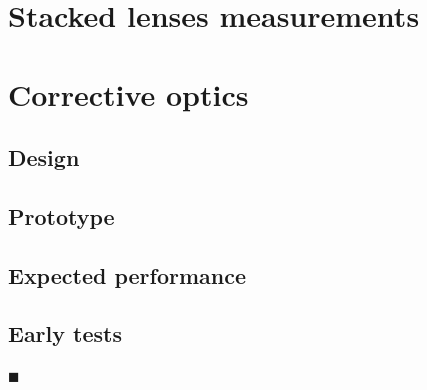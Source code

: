 \begin{refsection}
\section{Stacked lenses measurements}

\section{Corrective optics}
\subsection{Design}\label{sec:design}

\subsection{Prototype}\label{sec:prototype}

\subsection{Expected performance}\label{sec:performance}

\subsection{Early tests}\label{sec:prototype_testing}


$\blacksquare$
\printbibliography[heading=subbibliography]
\end{refsection}

